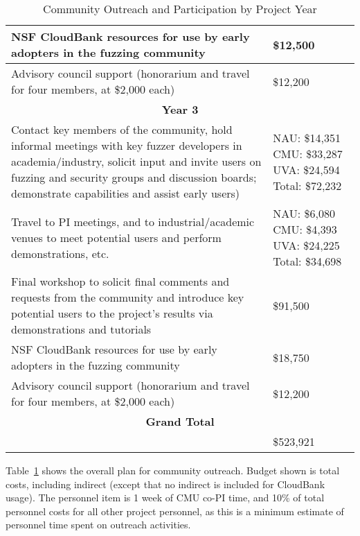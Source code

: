\documentclass[12pt]{article}
\begin{document}
\begin{table}
\begin{tabular}{|p{12cm}|p{3cm}|}
    \hline
    NSF CloudBank resources for use by early adopters in the fuzzing 
    community & \$12,500 \\
    \hline 
    Advisory council support (honorarium and travel for four members, 
    at \$2,000 each) & \$12,200 \\    
    \hline
    \hline
    \multicolumn{2}{c}{{\bf Year 3}} \\
    \hline
    \hline
   Contact key members of the community, hold informal meetings with
    key fuzzer developers in academia/industry, solicit input and
    invite users
    on fuzzing and security groups and discussion boards; demonstrate
    capabilities and assist early users) &  NAU:  \$14,351 CMU: \$33,287 UVA: \$24,594
                                                      Total: \$72,232 \\
    \hline
    Travel to PI meetings, and to industrial/academic venues to meet
    potential users and perform demonstrations, etc. & NAU: \$6,080 CMU: \$4,393 UVA:  \$24,225 Total: \$34,698\\
    \hline    
    Final workshop to solicit final comments and requests from the
    community and introduce key potential users to the project’s
    results via demonstrations and tutorials & \$91,500 \\
    \hline
    NSF CloudBank resources for use by early adopters in the fuzzing 
    community & \$18,750 \\
    \hline 
    Advisory council support (honorarium and travel for four members, 
    at \$2,000 each) & \$12,200 \\    
    \hline
    \hline
    \multicolumn{2}{c}{{\bf Grand Total}} \\
    \hline
                   &     \$523,921 \\
                     \hline
 
  \end{tabular}

  \caption{\label{outreach}Community Outreach and Participation by Project Year}
  
\end{table}


Table~\ref{outreach} shows the overall plan for community
outreach.   Budget shown is total costs, including indirect (except
that no indirect is included for CloudBank usage).   The personnel item is 1 week of CMU co-PI time, and 10\%
of total personnel costs for all other project personnel, as this is a
minimum estimate of personnel time spent on outreach activities.
\end{document}
